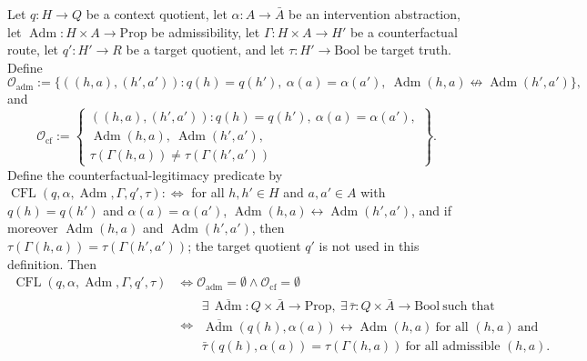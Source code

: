 \begin{theorem}\label{thm:F31}
Let \(q:H\to Q\) be a context quotient, let \(\alpha:A\to\bar A\) be an intervention abstraction, let \(\operatorname{Adm}:H\times A\to\mathrm{Prop}\) be admissibility, let
\(\Gamma:H\times A\to H'\) be a counterfactual route, let
\(q':H'\to R\) be a target quotient, and let
\(\tau:H'\to\mathrm{Bool}\) be target truth.  Define
\[
  \mathcal O_{\mathrm{adm}}
  :=
  \{((h,a),(h',a')) :
    q(h)=q(h'),\ \alpha(a)=\alpha(a'),\
    \operatorname{Adm}(h,a)\not\leftrightarrow
    \operatorname{Adm}(h',a')\},
\]
and
\[
  \mathcal O_{\mathrm{cf}}
  :=
  \left\{
  \begin{array}{l}
    ((h,a),(h',a')) :
    q(h)=q(h'),\ \alpha(a)=\alpha(a'),\\
    \operatorname{Adm}(h,a),\ \operatorname{Adm}(h',a'),\\
    \tau(\Gamma(h,a))\ne\tau(\Gamma(h',a'))
  \end{array}
  \right\}.
\]
Define the counterfactual-legitimacy predicate by
\(\operatorname{CFL}(q,\alpha,\operatorname{Adm},\Gamma,q',\tau):\Longleftrightarrow\)
for all \(h,h'\in H\) and \(a,a'\in A\) with \(q(h)=q(h')\) and
\(\alpha(a)=\alpha(a')\), \(\operatorname{Adm}(h,a)\leftrightarrow\operatorname{Adm}(h',a')\),
and if moreover \(\operatorname{Adm}(h,a)\) and \(\operatorname{Adm}(h',a')\), then
\(\tau(\Gamma(h,a))=\tau(\Gamma(h',a'))\); the target quotient \(q'\) is not used
in this definition.  Then
\begin{align*}
  \operatorname{CFL}(q,\alpha,\operatorname{Adm},\Gamma,q',\tau)
  &\iff
  \mathcal O_{\mathrm{adm}}=\emptyset
  \wedge
  \mathcal O_{\mathrm{cf}}=\emptyset\\
  &\iff
  \begin{gathered}
    \exists\,\overline{\operatorname{Adm}}:Q\times\bar A\to\mathrm{Prop},\
    \exists\,\bar\tau:Q\times\bar A\to\mathrm{Bool}
    \ \text{such that}\\
    \overline{\operatorname{Adm}}(q(h),\alpha(a))
      \leftrightarrow\operatorname{Adm}(h,a)
    \ \text{for all }(h,a)\ \text{and}\\
    \bar\tau(q(h),\alpha(a))=\tau(\Gamma(h,a))
    \ \text{for all admissible }(h,a).
  \end{gathered}
\end{align*}
\end{theorem}
